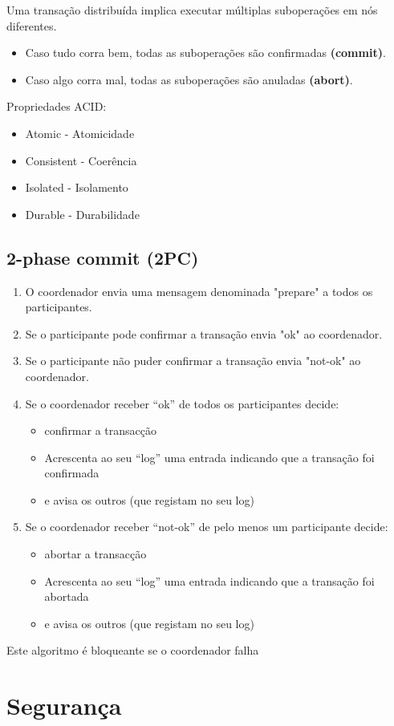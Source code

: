 \documentclass[12pt]{article}
\begin{document}
Uma transação distribuída implica executar múltiplas suboperações em nós diferentes.
\begin{itemize}
    \item Caso tudo corra bem, todas as suboperações são confirmadas \textbf{(commit)}.
    \item Caso algo corra mal, todas as suboperações são anuladas \textbf{(abort)}.
\end{itemize}

Propriedades ACID:
\begin{itemize}
    \item Atomic - Atomicidade
    \item Consistent - Coerência
    \item Isolated - Isolamento
    \item Durable - Durabilidade
\end{itemize}

\subsection{2-phase commit (2PC)}

\begin{enumerate}
    \item O coordenador envia uma mensagem denominada "prepare" a todos os participantes.
    \item Se o participante pode confirmar a transação envia "ok" ao coordenador.
    \item Se o participante não puder confirmar a transação envia "not-ok" ao coordenador.
    \item Se o coordenador receber “ok” de todos os participantes decide:
    \begin{itemize}
        \item confirmar a transacção
        \item Acrescenta ao seu “log” uma entrada indicando que a transação foi confirmada
        \item e avisa os outros (que registam no seu log)
    \end{itemize}
    \item Se o coordenador receber “not-ok” de pelo menos um participante decide:
    \begin{itemize}
        \item abortar a transacção
        \item Acrescenta ao seu “log” uma entrada indicando que a transação foi
        abortada
        \item e avisa os outros (que registam no seu log)
    \end{itemize}
\end{enumerate}

Este algoritmo é bloqueante se o coordenador falha

\newpage

\section{Segurança}
\end{document}
